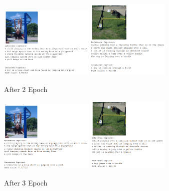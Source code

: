 \documentclass{article}
\begin{document}
    \begin{figure}[H]
        \centering
        \includegraphics[width=0.4\textwidth]{lstm_girl_epoch_2.PNG}
        \includegraphics[width=0.35\textwidth]{lstm_dog_epoch_2.PNG}
        \caption{After 2 Epoch}
    \end{figure}

    \begin{figure}[H]
        \centering
        \includegraphics[width=0.4\textwidth]{lstm_girl_epoch_3.PNG}
        \includegraphics[width=0.35\textwidth]{lstm_dog_epoch_3.PNG}
        \caption{After 3 Epoch}
    \end{figure}
\end{document}
